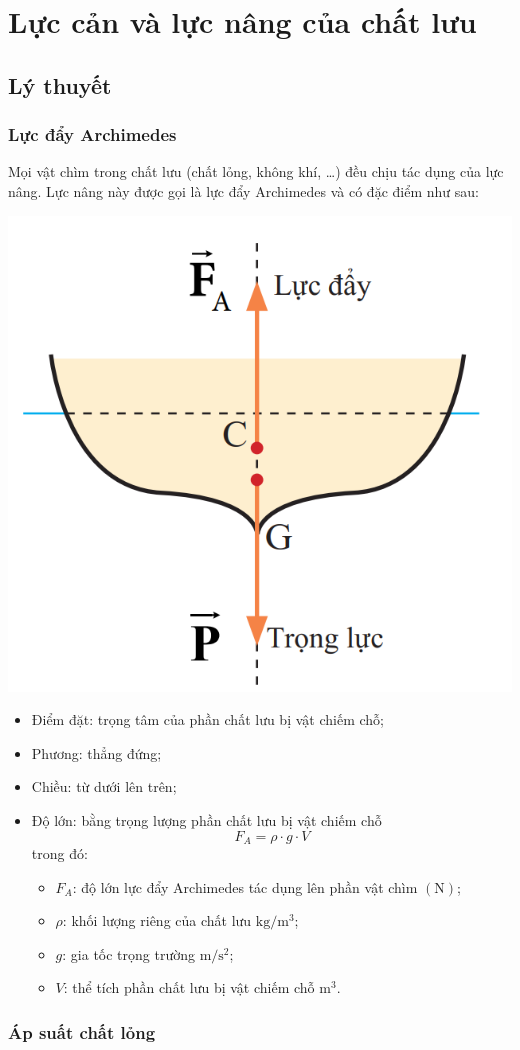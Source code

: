 \let\lesson\undefined
\newcommand{\lesson}{\phantomlesson{Bài 12: Một số lực trong thực tiễn}}
\chapter[Lực cản và lực nâng của chất lưu]{Lực cản và lực nâng của chất lưu}
\setcounter{section}{0}
\section{Lý thuyết}
\subsection{Lực đẩy Archimedes}
Mọi vật chìm trong chất lưu (chất lỏng, không khí, \dots) đều chịu tác dụng của lực nâng. Lực nâng này được gọi là lực đẩy Archimedes và có đặc điểm như sau:
\begin{center}
	\includegraphics[width=0.25\linewidth]{../figs/VN10-2023-PH-TP020-1}
\end{center}
\begin{itemize}
	\item Điểm đặt: trọng tâm của phần chất lưu bị vật chiếm chỗ;
	\item Phương: thẳng đứng;
	\item Chiều: từ dưới lên trên;
	\item Độ lớn: bằng trọng lượng phần chất lưu bị vật chiếm chỗ
	$$F_A=\rho \cdot g \cdot V$$
	trong đó:
	\begin{itemize}
		\item $F_A$: độ lớn lực đẩy Archimedes tác dụng lên phần vật chìm $\left(\si{\newton}\right)$;
		\item $\rho$: khối lượng riêng của chất lưu $\si{\kilogram/\meter^3}$;
		\item $g$: gia tốc trọng trường $\si{\meter/\second^2}$;
		\item $V$: thể tích phần chất lưu bị vật chiếm chỗ $\si{\meter^3}$.
	\end{itemize}
\end{itemize}
\subsection{Áp suất chất lỏng}
